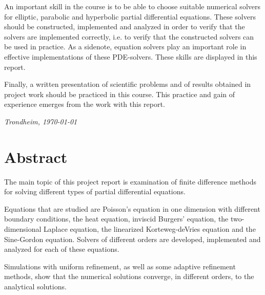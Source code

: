 \documentclass[a4paper, 12pt]{book}
\theoremstyle{break}
\theoremstyle{plain}
\begin{document}
\noindent An important skill in the course is to be able to choose suitable numerical solvers for elliptic, parabolic and hyperbolic partial differential equations. These solvers should be constructed, implemented and analyzed in order to verify that the solvers are implemented correctly, i.e. to verify that the constructed solvers can be used in practice. As a sidenote, equation solvers play an important role in effective implementations of these PDE-solvers. These skills are displayed in this report. \newline

\noindent Finally, a written presentation of scientific problems and of results obtained in project work should be practiced in this course. This practice and gain of experience emerges from the work with this report. 

\medskip
\begin{flushleft}
  \vspace*{1mm}
  \textit{Trondheim, \today}
\end{flushleft}

\chapter*{Abstract}
The main topic of this project report is examination of finite difference methods for solving different types of partial differential equations. \newline

\noindent Equations that are studied are Poisson's equation in one dimension with different boundary conditions, the heat equation, inviscid Burgers' equation, the two-dimensional Laplace equation, the linearized Korteweg-deVries equation and the Sine-Gordon equation. Solvers of different orders are developed, implemented and analyzed for each of these equations. \newline

\noindent Simulations with uniform refinement, as well as some adaptive refinement methods, show that the numerical solutions converge, in different orders, to the analytical solutions.

\tableofcontents

\end{document}
